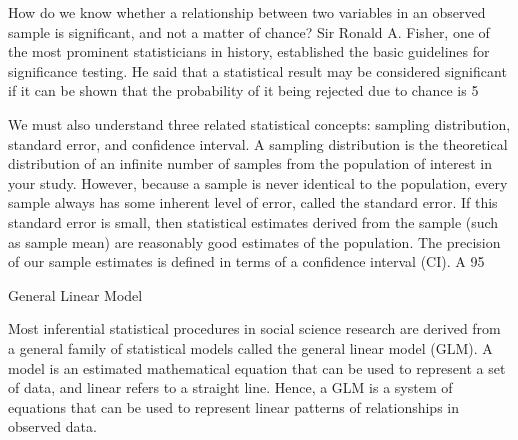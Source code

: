 How do we know whether a relationship between two variables in an observed sample is significant, and not a matter of chance? Sir Ronald A. Fisher, one of the most prominent statisticians in history, established the basic guidelines for significance testing. He said that a statistical result may be considered significant if it can be shown that the probability of it being rejected due to chance is 5%

We must also understand three related statistical concepts: sampling distribution, standard error, and confidence interval. A sampling distribution is the theoretical distribution of an infinite number of samples from the population of interest in your study. However, because a sample is never identical to the population, every sample always has some inherent level of error, called the standard error. If this standard error is small, then statistical estimates derived from the sample (such as sample mean) are reasonably good estimates of the population. The precision of our sample estimates is defined in terms of a confidence interval (CI). A 95%

General Linear Model

Most inferential statistical procedures in social science research are derived from a general family of statistical models called the general linear model (GLM). A model is an estimated mathematical equation that can be used to represent a set of data, and linear refers to a straight line. Hence, a GLM is a system of equations that can be used to represent linear patterns of relationships in observed data.

